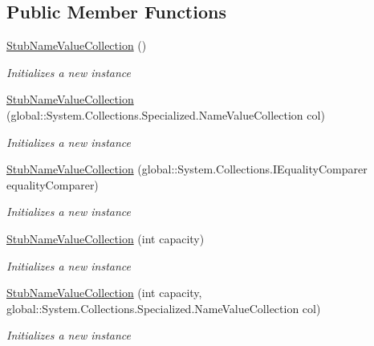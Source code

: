 \subsection*{Public Member Functions}
\begin{DoxyCompactItemize}
\item 
\hyperlink{class_system_1_1_collections_1_1_specialized_1_1_fakes_1_1_stub_name_value_collection_ad9ee082ce7ebd3f397a07c5cd6582625}{Stub\-Name\-Value\-Collection} ()
\begin{DoxyCompactList}\small\item\em Initializes a new instance\end{DoxyCompactList}\item 
\hyperlink{class_system_1_1_collections_1_1_specialized_1_1_fakes_1_1_stub_name_value_collection_acdb76af6a0a436f34a7bdab0b7f6d33c}{Stub\-Name\-Value\-Collection} (global\-::\-System.\-Collections.\-Specialized.\-Name\-Value\-Collection col)
\begin{DoxyCompactList}\small\item\em Initializes a new instance\end{DoxyCompactList}\item 
\hyperlink{class_system_1_1_collections_1_1_specialized_1_1_fakes_1_1_stub_name_value_collection_acc7e37e1af1bf8190943348941f900e5}{Stub\-Name\-Value\-Collection} (global\-::\-System.\-Collections.\-I\-Equality\-Comparer equality\-Comparer)
\begin{DoxyCompactList}\small\item\em Initializes a new instance\end{DoxyCompactList}\item 
\hyperlink{class_system_1_1_collections_1_1_specialized_1_1_fakes_1_1_stub_name_value_collection_a8369bfdb6696ea14af230b5076b12c6f}{Stub\-Name\-Value\-Collection} (int capacity)
\begin{DoxyCompactList}\small\item\em Initializes a new instance\end{DoxyCompactList}\item 
\hyperlink{class_system_1_1_collections_1_1_specialized_1_1_fakes_1_1_stub_name_value_collection_a3e6b46a98ff8e955131c4497449c902c}{Stub\-Name\-Value\-Collection} (int capacity, global\-::\-System.\-Collections.\-Specialized.\-Name\-Value\-Collection col)
\begin{DoxyCompactList}\small\item\em Initializes a new instance\end{DoxyCompactList}\item 

\end{DoxyCompactItemize}
